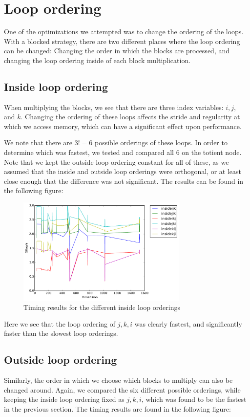 \documentclass[11pt]{amsart}
\begin{document}
\section*{Loop ordering}
One of the optimizations we attempted was to change the ordering of the loops. With a blocked strategy, there are two different places where the loop ordering can be changed: Changing the order in which the blocks are processed, and changing the loop ordering inside of each block multiplication.

\subsection*{Inside loop ordering}
When multiplying the blocks, we see that there are three index variables: $i,j,$ and $k$. Changing the ordering of these loops affects the stride and regularity at which we access memory, which can have a significant effect upon performance. 

We note that there are $3! = 6$ possible orderings of these loops. In order to determine which was fastest, we tested and compared all 6 on the totient node. Note that we kept the outside loop ordering constant for all of these, as we assumed that the inside and outside loop orderings were orthogonal, or at least close enough that the difference was not significant. The results can be found in the following figure:

\begin{figure}[hh]
\includegraphics[width=0.75\textwidth]{timing_insideloops.pdf}
\caption{Timing results for the different inside loop orderings}
\end{figure}
Here we see that the loop ordering of $j,k,i$ was clearly fastest, and significantly faster than the slowest loop orderings.

\newpage
\subsection*{Outside loop ordering}
Similarly, the order in which we choose which blocks to multiply can also be changed around. Again, we compared the six different possible orderings, while keeping the inside loop ordering fixed as $j,k,i$, which was found to be the fastest in the previous section. The timing results are found in the following figure:
\end{document}
